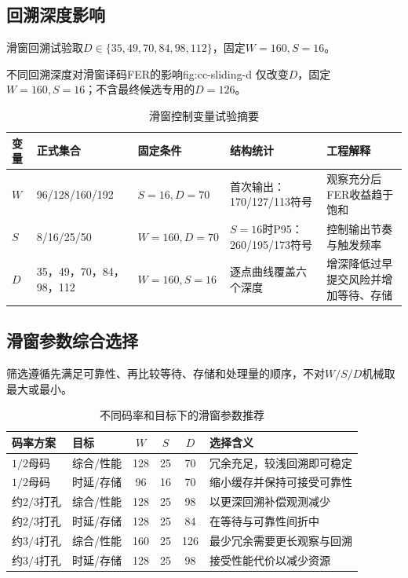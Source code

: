 \subsection{回溯深度影响}

滑窗回溯试验取$D\in\{35,49,70,84,98,112\}$，固定$W=160,S=16$。

  {不同回溯深度对滑窗译码FER的影响}{fig:cc-sliding-d}
  {仅改变$D$，固定$W=160,S=16$；不含最终候选专用的$D=126$。}

\begin{table}[htbp]
  \centering
  \scriptsize
  \caption{滑窗控制变量试验摘要}
  \label{tab:cc-sliding-controls}
  \begin{tabular}{p{}p{}p{}p{}p{}}
    \toprule
    变量 & 正式集合 & 固定条件 & 结构统计 & 工程解释 \\
    \midrule
    $W$ & 96/128/160/192 & $S=16,D=70$ & 首次输出：170/127/113符号 & 观察充分后FER收益趋于饱和 \\
    $S$ & 8/16/25/50 & $W=160,D=70$ & $S=16$时P95：260/195/173符号 & 控制输出节奏与触发频率 \\
    $D$ & 35，49，70，84，98，112 & $W=160,S=16$ & 逐点曲线覆盖六个深度 & 增深降低过早提交风险并增加等待、存储 \\
    \bottomrule
  \end{tabular}
\end{table}

\subsection{滑窗参数综合选择}

筛选遵循先满足可靠性、再比较等待、存储和处理量的顺序，不对$W/S/D$机械取最大或最小。

\begin{table}[htbp]
  \centering
  \scriptsize
  \caption{不同码率和目标下的滑窗参数推荐}
  \label{tab:cc-sliding-recommendations}
  \begin{tabular}{p{}p{}c c c p{}}
    \toprule
    码率方案 & 目标 & $W$ & $S$ & $D$ & 选择含义 \\
    \midrule
    $1/2$母码 & 综合/性能 & 128 & 25 & 70 & 冗余充足，较浅回溯即可稳定 \\
    $1/2$母码 & 时延/存储 & 96 & 16 & 70 & 缩小缓存并保持可接受可靠性 \\
    约$2/3$打孔 & 综合/性能 & 128 & 25 & 98 & 以更深回溯补偿观测减少 \\
    约$2/3$打孔 & 时延/存储 & 128 & 25 & 84 & 在等待与可靠性间折中 \\
    约$3/4$打孔 & 综合/性能 & 160 & 25 & 126 & 最少冗余需要更长观察与回溯 \\
    约$3/4$打孔 & 时延/存储 & 128 & 25 & 98 & 接受性能代价以减少资源 \\
    \bottomrule
  \end{tabular}
\end{table}

